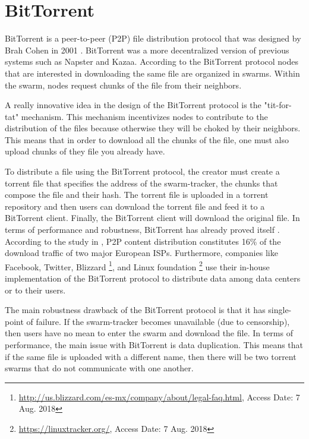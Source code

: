 {{}
\section{BitTorrent}{

BitTorrent is a peer-to-peer (P2P) file distribution protocol that was designed by Brah Cohen in 2001 \cite{BramCohen2008BitTorrentSpecification}. BitTorrent was a more decentralized version of previous systems such as Napster and Kazaa. According to the BitTorrent protocol nodes that are interested in downloading the same file are organized in swarms. Within the swarm, nodes request chunks of the file from their neighbors.

A really innovative idea in the design of the BitTorrent protocol is the "tit-for-tat" mechanism. This mechanism incentivizes nodes to contribute to the distribution of the files because otherwise they will be choked by their neighbors. This means that in order to download all the chunks of the file, one must also upload chunks of they file you already have.

To distribute a file using the BitTorrent protocol, the creator must create a torrent file that specifies the address of the swarm-tracker, the chunks that compose the file and their hash. The torrent file is uploaded in a torrent repository and then users can download the torrent file and feed it to a BitTorrent client. Finally, the BitTorrent client will download the original file. In terms of performance and robustness, BitTorrent has already proved itself  \cite{BitPerf}. According to the study in \cite{6912519}, P2P content distribution constitutes 16\% of the download traffic of two major European ISPs. Furthermore, companies like Facebook, Twitter, Blizzard \footnote{\url{http://us.blizzard.com/es-mx/company/about/legal-faq.html}, Access Date: 7 Aug. 2018}, and Linux foundation \footnote{\url{https://linuxtracker.org/}, Access Date: 7 Aug. 2018} use their in-house implementation of the BitTorrent protocol to distribute data among data centers or to their users.

The main robustness drawback of the BitTorrent protocol is that it has single-point of failure. If the swarm-tracker becomes unavailable (due to censorship), then users have no mean to enter the swarm and download the file. In terms of performance, the main issue with BitTorrent is data duplication. This means that if the same file is uploaded with a different name, then there will be two torrent swarms that do not communicate with one another.
}
}
